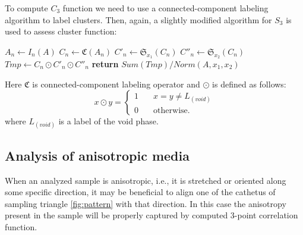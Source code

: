 \documentclass[reprint,amsmath,amssymb,aps,pre,showkeys,showpacs]{revtex4-1}
\begin{document}
To compute $C_3$ function we need to use a connected-component labeling
algorithm \cite{4728561,PhysRevB.14.3438} to label clusters. Then, again, a
slightly modified algorithm for $S_3$ is used to assess cluster function:
\begin{algorithmic}[1]
  \State $A_n \gets I_n (A)$
  \State $C_n \gets \mathfrak{C}(A_n)$
  \State $C'_n \gets \mathfrak{S}_{x_1}(C_n)$
  \State $C''_n \gets \mathfrak{S}_{x_2}(C_n)$
  \State $Tmp \gets C_n \odot C'_n \odot C''_n$
  \State \textbf{return} $Sum(Tmp) / Norm(A, x_1, x_2)$
  \EndProcedure
\end{algorithmic}
Here $\mathfrak{C}$ is connected-component labeling operator and $\odot$ is
defined as follows:
\begin{equation}
  x \odot y = \left\{
  \begin{array}{ll}
    1 & \quad x = y \ne L_{(void)} \\
    0 & \quad \text{otherwise}.
  \end{array}
  \right.
\end{equation}
where $L_{(void)}$ is a label of the void phase.

\subsection{Analysis of anisotropic media}
When an analyzed sample is anisotropic, i.e., it is stretched or oriented along
some specific direction, it may be beneficial to align one of the cathetus of
sampling triangle \cref{fig:pattern} with that direction. In this case the
anisotropy present in the sample will be properly captured by computed 3-point
correlation function.
\end{document}
